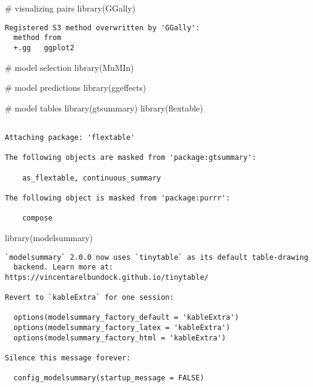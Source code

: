 \documentclass[
  letterpaper,
  DIV=11,
  numbers=noendperiod]{scrartcl}
\newenvironment{Shaded}{\begin{snugshade}}{\end{snugshade}}
\newcommand{\CommentTok}[1]{\textcolor[rgb]{0.37,0.37,0.37}{#1}}
\newcommand{\FunctionTok}[1]{\textcolor[rgb]{0.28,0.35,0.67}{#1}}
\newcommand{\NormalTok}[1]{\textcolor[rgb]{0.00,0.23,0.31}{#1}}
\begin{document}
\begin{Shaded}
\begin{Highlighting}[]
\CommentTok{\# visualizing pairs}
\FunctionTok{library}\NormalTok{(GGally)}
\end{Highlighting}
\end{Shaded}

\begin{verbatim}
Registered S3 method overwritten by 'GGally':
  method from   
  +.gg   ggplot2
\end{verbatim}

\begin{Shaded}
\begin{Highlighting}[]
\CommentTok{\# model selection}
\FunctionTok{library}\NormalTok{(MuMIn)}

\CommentTok{\# model predictions}
\FunctionTok{library}\NormalTok{(ggeffects)}

\CommentTok{\# model tables}
\FunctionTok{library}\NormalTok{(gtsummary)}
\FunctionTok{library}\NormalTok{(flextable)}
\end{Highlighting}
\end{Shaded}

\begin{verbatim}

Attaching package: 'flextable'

The following objects are masked from 'package:gtsummary':

    as_flextable, continuous_summary

The following object is masked from 'package:purrr':

    compose
\end{verbatim}

\begin{Shaded}
\begin{Highlighting}[]
\FunctionTok{library}\NormalTok{(modelsummary)}
\end{Highlighting}
\end{Shaded}

\begin{verbatim}
`modelsummary` 2.0.0 now uses `tinytable` as its default table-drawing
  backend. Learn more at: https://vincentarelbundock.github.io/tinytable/

Revert to `kableExtra` for one session:

  options(modelsummary_factory_default = 'kableExtra')
  options(modelsummary_factory_latex = 'kableExtra')
  options(modelsummary_factory_html = 'kableExtra')

Silence this message forever:

  config_modelsummary(startup_message = FALSE)
\end{verbatim}
\end{document}
